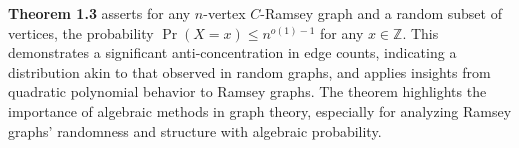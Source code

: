 \textbf{Theorem 1.3} asserts for any $n$-vertex $C$-Ramsey graph and a random subset of vertices, the probability $\Pr(X = x) \leq n^{o(1)-1}$ for any $x \in \mathbb{Z}$. This demonstrates a significant anti-concentration in edge counts, indicating a distribution akin to that observed in random graphs, and applies insights from quadratic polynomial behavior to Ramsey graphs.
The theorem highlights the importance of algebraic methods in graph theory,
especially for analyzing Ramsey graphs' randomness and structure with algebraic probability.


